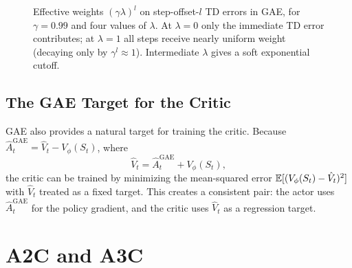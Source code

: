 \begin{figure}[ht]
\caption{Effective weights $(\gamma\lambda)^l$ on step-offset-$l$ TD errors
in GAE, for $\gamma = 0.99$ and four values of $\lambda$.  At $\lambda=0$
only the immediate TD error contributes; at $\lambda=1$ all steps receive
nearly uniform weight (decaying only by $\gamma^l \approx 1$).  Intermediate
$\lambda$ gives a soft exponential cutoff.}
\label{fig:gae-lambda}
\end{figure}

\subsection{The GAE Target for the Critic}

GAE also provides a natural target for training the critic.  Because
$\hat{A}_t^{\mathrm{GAE}} = \hat{V}_t - V_\phi(S_t)$, where
\begin{equation}
\label{eq:gae-vtarget}
\hat{V}_t = \hat{A}_t^{\mathrm{GAE}} + V_\phi(S_t),
\end{equation}
the critic can be trained by minimizing the mean-squared error
$\operatorname{\mathbb{E}}[(V_\phi(S_t) - \hat{V}_t)^2]$ with $\hat{V}_t$ treated as a fixed
target.  This creates a consistent pair: the actor uses
$\hat{A}_t^{\mathrm{GAE}}$ for the policy gradient, and the critic uses
$\hat{V}_t$ as a regression target.

\section{A2C and A3C}
\label{sec:a3c}

